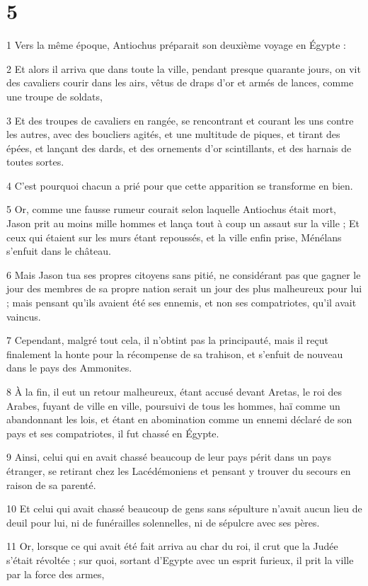 \chapter{5}

\par 1 Vers la même époque, Antiochus préparait son deuxième voyage en Égypte :
\par 2 Et alors il arriva que dans toute la ville, pendant presque quarante jours, on vit des cavaliers courir dans les airs, vêtus de draps d'or et armés de lances, comme une troupe de soldats,
\par 3 Et des troupes de cavaliers en rangée, se rencontrant et courant les uns contre les autres, avec des boucliers agités, et une multitude de piques, et tirant des épées, et lançant des dards, et des ornements d'or scintillants, et des harnais de toutes sortes.
\par 4 C'est pourquoi chacun a prié pour que cette apparition se transforme en bien.
\par 5 Or, comme une fausse rumeur courait selon laquelle Antiochus était mort, Jason prit au moins mille hommes et lança tout à coup un assaut sur la ville ; Et ceux qui étaient sur les murs étant repoussés, et la ville enfin prise, Ménélans s'enfuit dans le château.
\par 6 Mais Jason tua ses propres citoyens sans pitié, ne considérant pas que gagner le jour des membres de sa propre nation serait un jour des plus malheureux pour lui ; mais pensant qu'ils avaient été ses ennemis, et non ses compatriotes, qu'il avait vaincus.
\par 7 Cependant, malgré tout cela, il n'obtint pas la principauté, mais il reçut finalement la honte pour la récompense de sa trahison, et s'enfuit de nouveau dans le pays des Ammonites.
\par 8 À la fin, il eut un retour malheureux, étant accusé devant Aretas, le roi des Arabes, fuyant de ville en ville, poursuivi de tous les hommes, haï comme un abandonnant les lois, et étant en abomination comme un ennemi déclaré de son pays et ses compatriotes, il fut chassé en Égypte.
\par 9 Ainsi, celui qui en avait chassé beaucoup de leur pays périt dans un pays étranger, se retirant chez les Lacédémoniens et pensant y trouver du secours en raison de sa parenté.
\par 10 Et celui qui avait chassé beaucoup de gens sans sépulture n'avait aucun lieu de deuil pour lui, ni de funérailles solennelles, ni de sépulcre avec ses pères.
\par 11 Or, lorsque ce qui avait été fait arriva au char du roi, il crut que la Judée s'était révoltée ; sur quoi, sortant d'Egypte avec un esprit furieux, il prit la ville par la force des armes,
